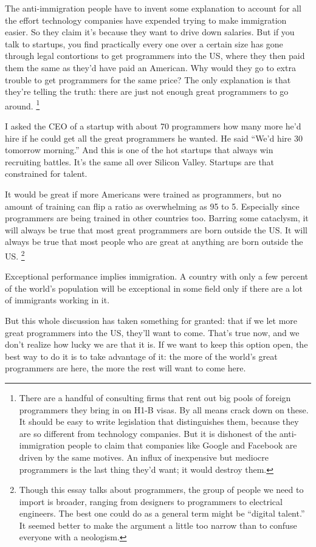 \documentclass[12pt]{book}
\begin{document}
The anti-immigration people have to invent some explanation to account
for all the effort technology companies have expended trying to make
immigration easier. So they claim it's because they want to drive down
salaries. But if you talk to startups, you find practically every one
over a certain size has gone through legal contortions to get
programmers into the US, where they then paid them the same as they'd
have paid an American. Why would they go to extra trouble to get
programmers for the same price? The only explanation is that they're
telling the truth: there are just not enough great programmers to go
around. \footnote{There are a handful of consulting firms that rent out big pools
of foreign programmers they bring in on H1-B visas. By all means crack
down on these. It should be easy to write legislation that distinguishes
them, because they are so different from technology companies. But it is
dishonest of the anti-immigration people to claim that companies like
Google and Facebook are driven by the same motives. An influx of
inexpensive but mediocre programmers is the last thing they'd want; it
would destroy them.}

I asked the CEO of a startup with about 70 programmers how many more
he'd hire if he could get all the great programmers he wanted. He said
``We'd hire 30 tomorrow morning.'' And this is one of the hot startups
that always win recruiting battles. It's the same all over Silicon
Valley. Startups are that constrained for talent.

It would be great if more Americans were trained as programmers, but no
amount of training can flip a ratio as overwhelming as 95 to 5.
Especially since programmers are being trained in other countries too.
Barring some cataclysm, it will always be true that most great
programmers are born outside the US. It will always be true that most
people who are great at anything are born outside the US.
\footnote{Though this essay talks about programmers, the group of people
we need to import is broader, ranging from designers to programmers to
electrical engineers. The best one could do as a general term might be
``digital talent.'' It seemed better to make the argument a little too
narrow than to confuse everyone with a neologism.}

Exceptional performance implies immigration. A country with only a few
percent of the world's population will be exceptional in some field only
if there are a lot of immigrants working in it.

But this whole discussion has taken something for granted: that if we
let more great programmers into the US, they'll want to come. That's
true now, and we don't realize how lucky we are that it is. If we want
to keep this option open, the best way to do it is to take advantage of
it: the more of the world's great programmers are here, the more the
rest will want to come here.
\end{document}
